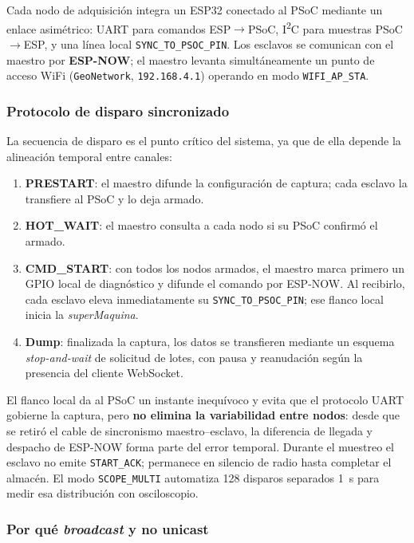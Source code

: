 Cada nodo de adquisici\'on integra un ESP32 conectado al PSoC mediante un enlace
asim\'etrico: UART para comandos ESP$\to$PSoC, I\textsuperscript{2}C para muestras
PSoC$\to$ESP, y una l\'inea local \texttt{SYNC\_TO\_PSOC\_PIN}. Los esclavos se
comunican con el maestro por \textbf{ESP-NOW};
el maestro levanta simult\'aneamente un punto de acceso WiFi (\texttt{GeoNetwork},
\texttt{192.168.4.1}) operando en modo \texttt{WIFI\_AP\_STA}.

\subsubsection{Protocolo de disparo sincronizado}

La secuencia de disparo es el punto cr\'itico del sistema, ya que de ella depende la
alineaci\'on temporal entre canales:

\begin{enumerate}[itemsep=0.15em]
    \item \textbf{PRESTART}: el maestro difunde la configuraci\'on de captura; cada
    esclavo la transfiere al PSoC y lo deja armado.
    \item \textbf{HOT\_WAIT}: el maestro consulta a cada nodo si su PSoC confirm\'o el
    armado.
    \item \textbf{CMD\_START}: con todos los nodos armados, el maestro marca primero un
    GPIO local de diagn\'ostico y difunde el comando por ESP-NOW. Al recibirlo, cada
    esclavo eleva inmediatamente su \texttt{SYNC\_TO\_PSOC\_PIN}; ese flanco local inicia
    la \emph{superMaquina}.
    \item \textbf{Dump}: finalizada la captura, los datos se transfieren mediante un
    esquema \emph{stop-and-wait} de solicitud de lotes, con pausa y reanudaci\'on seg\'un
    la presencia del cliente WebSocket.
\end{enumerate}

El flanco local da al PSoC un instante inequ\'ivoco y evita que el protocolo UART gobierne
la captura, pero \textbf{no elimina la variabilidad entre nodos}: desde que se retir\'o el
cable de sincronismo maestro--esclavo, la diferencia de llegada y despacho de ESP-NOW
forma parte del error temporal. Durante el muestreo el esclavo no emite
\texttt{START\_ACK}; permanece en silencio de radio hasta completar el almac\'en. El modo
\texttt{SCOPE\_MULTI} automatiza 128 disparos separados \SI{1}{\second} para medir esa
distribuci\'on con osciloscopio.

\subsubsection{Por qu\'e \emph{broadcast} y no unicast}
\label{sec:arq-broadcast}


